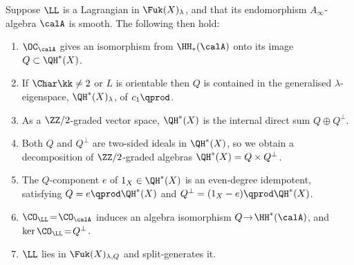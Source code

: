 \begin{theorem}
\label{thmGen}
Suppose $\LL$ is a Lagrangian in $\Fuk(X)_\lambda$, and that its endomorphism $A_\infty$-algebra $\calA$ is smooth. The following then hold:
\begin{enumerate}
\item\label{genOC} $\OC_\calA$ gives an isomorphism from $\HH_*(\calA)$ onto its image $Q \subset \QH^*(X)$.
\item\label{genEspace} If $\Char \kk \neq 2$ or $L$ is orientable then $Q$ is contained in the generalised $\lambda$\nobreakdash-eigen\-space, $\QH^*(X)_\lambda$, of $c_1\qprod$.
\item\label{genVSdecomp} As a $\ZZ/2$-graded vector space, $\QH^*(X)$ is the internal direct sum $Q \oplus Q^\perp$.
\item\label{genAlgDecomp} Both $Q$ and $Q^\perp$ are two-sided ideals in $\QH^*(X)$, so we obtain a decomposition of $\ZZ/2$-graded algebras $\QH^*(X) = Q \times Q^\perp$.
\item\label{genIdemp} The $Q$-component $e$ of $1_X \in \QH^*(X)$ is an even-degree idempotent, satisfying $Q = e \qprod \QH^*(X)$ and $Q^\perp = (1_X-e) \qprod \QH^*(X)$.
\item\label{genCO} $\CO_{\LL} \!=\! \CO_\calA$ induces an algebra isomorphism $Q \!\to\! \HH^*(\calA)$, and \hbox{$\ker \CO_{\LL} \!=\! Q^\perp$}.
\item\label{genSplitGen} $\LL$ lies in $\Fuk(X)_{\lambda, Q}$ and split-generates it.
\end{enumerate}
\end{theorem}
